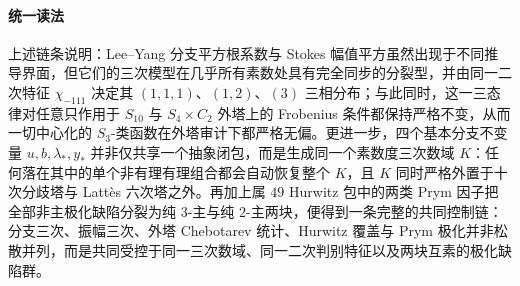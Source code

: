 \paragraph{统一读法}
上述链条说明：Lee--Yang 分支平方根系数与 Stokes 幅值平方虽然出现于不同推导界面，但它们的三次模型在几乎所有素数处具有完全同步的分裂型，并由同一二次特征 \(\chi_{-111}\) 决定其 \((1,1,1)\)、\((1,2)\)、\((3)\) 三相分布；与此同时，这一三态律对任意只作用于 \(S_{10}\) 与 \(S_4\times C_2\) 外塔上的 Frobenius 条件都保持严格不变，从而一切中心化的 \(S_3\)-类函数在外塔审计下都严格无偏。更进一步，四个基本分支不变量 \(u,b,\lambda_*,y_*\) 并非仅共享一个抽象闭包，而是生成同一个素数度三次数域 \(K\)：任何落在其中的单个非有理有理组合都会自动恢复整个 \(K\)，且 \(K\) 同时严格外置于十次分歧塔与 Latt\`es 六次塔之外。再加上属 \(49\) Hurwitz 包中的两类 Prym 因子把全部非主极化缺陷分裂为纯 \(3\)-主与纯 \(2\)-主两块，便得到一条完整的共同控制链：分支三次、振幅三次、外塔 Chebotarev 统计、Hurwitz 覆盖与 Prym 极化并非松散并列，而是共同受控于同一三次数域、同一二次判别特征以及两块互素的极化缺陷群。

\endinput
